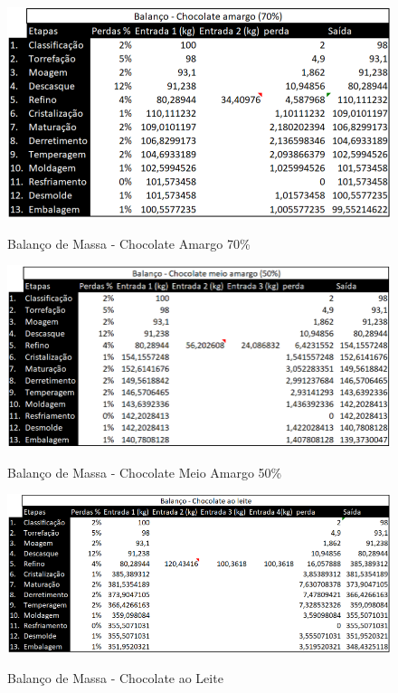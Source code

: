 \documentclass[
	12pt,				%
	openright,			%
	oneside,			%
	a4paper,			%
	english,			%
	french,				%
	spanish,			%
	brazil				%
	]{abntex2}
\begin{document}
\begin{figure}[H]
\begin{center}
\caption{Balanço de Massa - Chocolate Amargo 70\%}
\includegraphics[scale=0.46]{../../Pictures/bm1.png} 
\label{bm1}
\end{center}
\end{figure}

\begin{figure}[H]
\begin{center}
\caption{Balanço de Massa - Chocolate Meio Amargo 50\%}
\includegraphics[scale=0.53]{../../Pictures/bm2.png} 
\label{bm2}
\end{center}
\end{figure}

\begin{figure}[H]
\begin{center}
\caption{Balanço de Massa - Chocolate ao Leite}
\includegraphics[scale=0.53]{../../Pictures/bm3.png} 
\label{bm3}
\end{center}
\end{figure}
\end{document}
